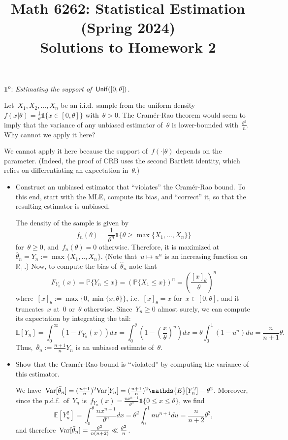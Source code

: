 \documentclass[11pt]{article}
\title{Math 6262: Statistical Estimation (Spring 2024)\\ 
	   Solutions to Homework 2}
\date{}
\author{}
\newcommand{\proofstep}[1]{$\boldsymbol{{#1}^o}$}
\newcommand{\R}{\mathds{R}}
\newcommand{\E}{\mathds{E}}
\newcommand{\Prob}{\mathds{P}}
\newcommand{\Var}{\textup{Var}}
\newcommand{\wh}{\widehat}
\newcommand{\Unif}{\textup{\textsf{Unif}}}
\newcommand{\leqs}{\leqslant}
\newcommand{\geqs}{\geqslant}
\renewcommand{\le}{\leqs}
\renewcommand{\ge}{\geqs}
\newcommand{\odima}[1]{{\color{red} #1}}
\begin{document}
\maketitle

\iffalse

\proofstep{1}: {\em Estimating the support of~$\Unif([0,\theta])$.}

Let~$X_1, X_2, ..., X_n$ be an i.i.d.~sample from the uniform density~$f(x|\theta) = \frac{1}{\theta} \mathds{1}\{x \in [0,\theta]\}$ with~$\theta > 0$. 
The Cram\'er-Rao theorem would seem to imply that the variance of any unbiased estimator of~$\theta$ is lower-bounded with~$\frac{\theta^2}{n}$. Why cannot we apply it here?

\odima{We cannot apply it here because the support of~$f(\cdot|\theta)$ depends on the parameter. (Indeed, the proof of CRB uses the second Bartlett identity, which relies on  differentiating an expectation in~$\theta$.)}

\begin{itemize}
\item
Construct an unbiased estimator that ``violates'' the Cram\'er-Rao bound. 
To this end, start with the MLE, compute its bias, and ``correct'' it, so that the resulting estimator is unbiased.

\odima{The density of the sample is given by
\[
f_n(\theta) = \frac{1}{\theta^n} \mathds{1}\{\theta \ge \max\{X_1, ..., X_n \}\}
\]
for~$\theta \ge 0$, and~$f_n(\theta) = 0$ otherwise. Therefore, it is maximized at~$\wh\theta_n = Y_n := \max\{X_1,..,X_n\}$. 
(Note that~$u \mapsto u^n$ is an increasing function on~$\R_+$.) Now, to compute the bias of~$\wh\theta_n$ note that
\[
F_{Y_n}(x) = \Prob\{ Y_n \le x \} = (\Prob \{X_1 \le x \})^n = \left(\frac{[x]_{\theta}}{\theta} \right)^n
\]
where~$[x]_{\theta} := \max\{0, \min\{x,\theta\}\}$, i.e.~$[x]_{\theta} = x$ for~$x \in [0,\theta]$, and it truncates~$x$ at~$0$ or~$\theta$ otherwise.
Since~$Y_n \ge 0$ almost surely, we can compute its expectation by integrating the tail:
\[
\E[Y_n] 
= \int_{0}^{\infty} (1-F_{Y_n}(x)) dx 
= \int_{0}^{\theta} \left(1 - \left(\frac{x}{\theta} \right)^n \right) dx 
= \theta\int_{0}^{1} \left(1 - u^n \right) du 
=  \frac{n}{n+1}\theta.
\]
Thus,~$\bar\theta_n := \frac{n+1}{n} Y_n$ is an unbiased estimate of~$\theta$. 
}
\item
Show that the Cram\'er-Rao bound is ``violated'' by computing the variance of this estimator.

\odima{
We have~$\Var[\bar\theta_n] = (\frac{n+1}{n})^2 \Var[Y_n] = (\frac{n+1}{n})^2 \E[Y_n^2] - \theta^2$. Moreover, since the p.d.f.~of~$Y_n$ is~$f_{Y_n}(x) = \frac{n x^{n-1}}{\theta^n} \mathds{1}\{0 \le x \le \theta\}$, we find
\[
\E[Y_n^2] 
= \int_0^{\theta} \frac{n x^{n+1}}{\theta^n} dx 
= \theta^2 \int_0^{1} n u^{n+1} du 
= \frac{n}{n+2}\theta^2,
\]
and therefore~$\Var[\bar\theta_n] = \frac{\theta^2}{n(n+2)} \ll \frac{\theta^2}{n}$.
}
\end{itemize}
\end{document}
